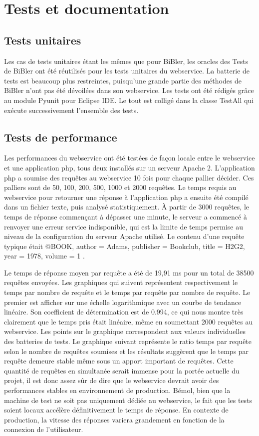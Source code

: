 \documentclass[12pt,titlepage]{article}
\let\oldsection\section
\renewcommand\section{\clearpage\oldsection}
\begin{document}
\section{Tests et documentation}
\subsection{Tests unitaires}
Les cas de tests unitaires étant les mêmes que pour BiBler, les oracles des Tests de BiBler ont été réutilisés pour les tests unitaires du webservice. La batterie de tests est beaucoup plus restreintes, puisqu'une grande partie des méthodes de BiBler n'ont pas été dévoilées dans son webservice. Les tests ont été rédigés grâce au module Pyunit pour Eclipse IDE. Le tout est colligé dans la classe TestAll qui exécute successivement l'ensemble des tests. \newline
\subsection{Tests de performance}
Les performances du webservice ont été testées de façon locale entre le webservice et une application php, tous deux installés sur un serveur Apache 2. L'application php a soumise des requêtes au webservice 10 fois pour chaque pallier décider. Ces palliers sont de 50, 100, 200, 500, 1000 et 2000 requêtes. Le temps requis au webservice pour retourner une réponse à l'application php a ensuite été compilé dans un fichier texte, puis analysé statistiquement. À partir de 3000 requêtes, le temps de réponse commençant à dépasser une minute, le serveur a commencé à renvoyer une erreur service indisponible, qui est la limite de temps permise au niveau de la configuration du serveur Apache utilisé. Le contenu d'une requête typique était @BOOK{, author = {Adams}, publisher = {Bookclub}, title = {H2G2}, year = {1978}, volume = {1} }. \newline

Le temps de réponse moyen par requête a été de 19,91 ms pour un total de 38500 requêtes envoyées. Les graphiques qui suivent représentent respectivement le temps par nombre de requête et le temps par requête par nombre de requête. Le premier est afficher sur une échelle logarithmique avec un courbe de tendance linéaire. Son coefficient de détermination est de 0.994, ce qui nous montre très clairement que le temps pris était linéaire, même en soumettant 2000 requêtes au webservice. Les points sur le graphique correspondent aux valeurs individuelles des batteries de tests. Le graphique suivant représente le ratio temps par requête selon le nombre de requêtes soumises et les résultats suggèrent que le temps par requête demeure stable même sous un apport important de requêtes. Cette quantité de requêtes en simultanée serait immense pour la portée actuelle du projet, il est donc assez sûr de dire que le webservice devrait avoir des performances stables en environnement de production. Bémol, bien que la machine de test ne soit pas uniquement dédiée au webservice, le fait que les tests soient locaux accélère définitivement le temps de réponse. En contexte de production, la vitesse des réponses variera grandement en fonction de la connexion de l'utilisateur. \newline
\end{document}
